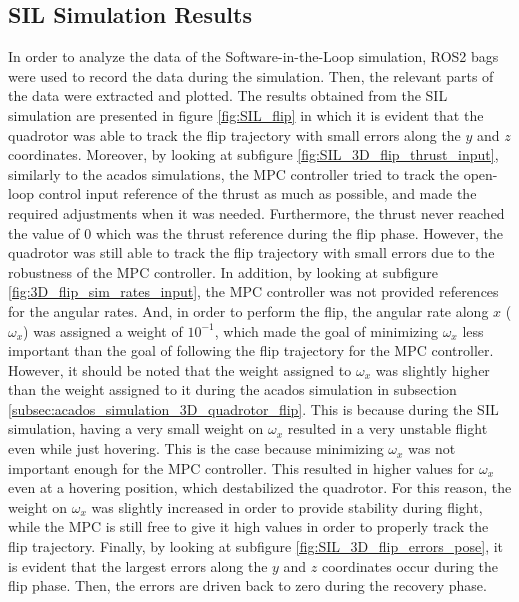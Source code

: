 \documentclass{thesisreport}
\begin{document}
\subsection{SIL Simulation Results}

In order to analyze the data of the Software-in-the-Loop simulation, ROS2 bags were used to record the data during the simulation. Then, the relevant parts of the data were extracted and plotted. The results obtained from the SIL simulation are presented in figure \ref{fig:SIL_flip} in which it is evident that the quadrotor was able to track the flip trajectory with small errors along the $y$ and $z$ coordinates. Moreover, by looking at subfigure \ref{fig:SIL_3D_flip_thrust_input}, similarly to the acados simulations, the MPC controller tried to track the open-loop control input reference of the thrust as much as possible, and made the required adjustments when it was needed. Furthermore, the thrust never reached the value of 0 which was the thrust reference during the flip phase. However, the quadrotor was still able to track the flip trajectory with small errors due to the robustness of the MPC controller. In addition, by looking at subfigure \ref{fig:3D_flip_sim_rates_input}, the MPC controller was not provided references for the angular rates. And, in order to perform the flip, the angular rate along $x$ ($\omega_x$) was assigned a weight of $10^{-1}$, which made the goal of minimizing $\omega_x$ less important than the goal of following the flip trajectory for the MPC controller. However, it should be noted that the weight assigned to $\omega_x$ was slightly higher than the weight assigned to it during the acados simulation in subsection \ref{subsec:acados_simulation_3D_quadrotor_flip}. This is because during the SIL simulation, having a very small weight on $\omega_x$ resulted in a very unstable flight even while just hovering. This is the case because minimizing $\omega_x$ was not important enough for the MPC controller. This resulted in higher values for $\omega_x$ even at a hovering position, which destabilized the quadrotor. For this reason, the weight on $\omega_x$ was slightly increased in order to provide stability during flight, while the MPC is still free to give it high values in order to properly track the flip trajectory. Finally, by looking at subfigure \ref{fig:SIL_3D_flip_errors_pose}, it is evident that the largest errors along the $y$ and $z$ coordinates occur during the flip phase. Then, the errors are driven back to zero during the recovery phase.
\end{document}

